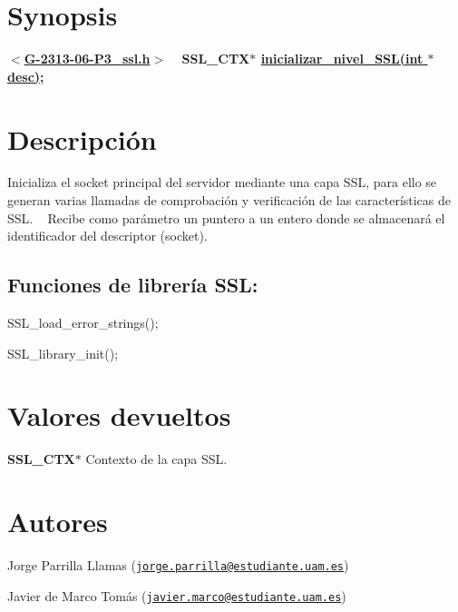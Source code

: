 \hypertarget{inicializar_nivel_SSL_synopsis_1}{}\section{Synopsis}\label{inicializar_nivel_SSL_synopsis_1}
{ {\bfseries $<$\hyperlink{G-2313-06-P3__ssl_8h}{G-\/2313-\/06-\/\+P3\+\_\+ssl.\+h}$>$} ~\newline
 {\bfseries S\+S\+L\+\_\+\+C\+T\+X$\ast$ \hyperlink{G-2313-06-P3__ssl_8c_a32d6d68d1f64d25effa1ea5ec1e6bdb3}{inicializar\+\_\+nivel\+\_\+\+S\+S\+L(int $\ast$desc)};} } \hypertarget{inicializar_nivel_SSL_descripcion_1}{}\section{Descripción}\label{inicializar_nivel_SSL_descripcion_1}
Inicializa el socket principal del servidor mediante una capa S\+SL, para ello se generan varias llamadas de comprobación y verificación de las características de S\+SL. ~\newline
Recibe como parámetro un puntero a un entero donde se almacenará el identificador del descriptor (socket). ~\newline
\subsection*{{\bfseries Funciones de librería S\+SL\+:}}


\begin{DoxyItemize}
\item S\+S\+L\+\_\+load\+\_\+error\+\_\+strings(); 
\item S\+S\+L\+\_\+library\+\_\+init(); 
\end{DoxyItemize}\hypertarget{inicializar_nivel_SSL_return_1}{}\section{Valores devueltos}\label{inicializar_nivel_SSL_return_1}

\begin{DoxyItemize}
\item {\bfseries S\+S\+L\+\_\+\+C\+T\+X$\ast$} Contexto de la capa S\+SL. 
\end{DoxyItemize}\hypertarget{inicializar_nivel_SSL_authors_1}{}\section{Autores}\label{inicializar_nivel_SSL_authors_1}

\begin{DoxyItemize}
\item Jorge Parrilla Llamas (\href{mailto:jorge.parrilla@estudiante.uam.es}{\tt jorge.\+parrilla@estudiante.\+uam.\+es}) 
\item Javier de Marco Tomás (\href{mailto:javier.marco@estudiante.uam.es}{\tt javier.\+marco@estudiante.\+uam.\+es}) 
\end{DoxyItemize}